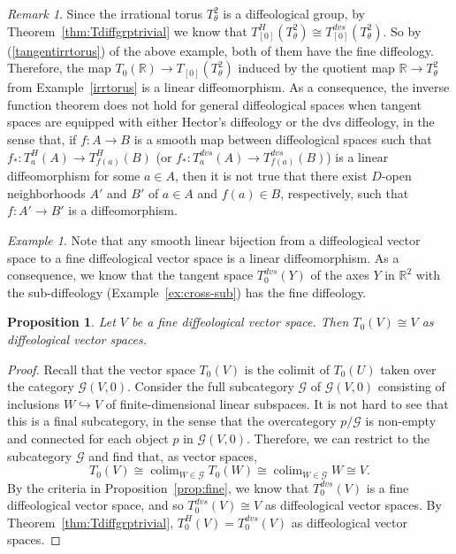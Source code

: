 \documentclass[12pt]{amsart}
\newtheorem{prop}[de]{Proposition}
\theoremstyle{remark}
\newtheorem{rem}[de]{Remark}
\newtheorem{ex}[de]{Example}
\DeclareMathOperator*{\colim}{colim}
\newcommand{\ra}{\to}
\newcommand{\cG}{{\mathcal{G}}}
\def \R{\mathbb{R}}
\begin{document}
\begin{rem}\label{rem:inverse}
Since the irrational torus $T^2_\theta$ is a diffeological group, by Theorem~\ref{thm:Tdiffgrptrivial}
we know that $T^H_{[0]}(T^2_\theta) \cong T^{dvs}_{[0]}(T^2_\theta)$.
So by (\ref{tangentirrtorus}) of the above example, both of them have the fine diffeology.
Therefore, the map $T_0(\R) \ra T_{[0]}(T^2_\theta)$ induced by the
quotient map $\R \to T^2_\theta$ from Example~\ref{irrtorus} is a linear diffeomorphism.
As a consequence, the inverse function theorem does not hold for general diffeological spaces
when tangent spaces are equipped with either Hector's diffeology or the dvs diffeology,
in the sense that, if $f:A \ra B$ is a smooth map between diffeological spaces such that
$f_*:T_a^H(A) \ra T_{f(a)}^H(B)$ (or $f_*:T_a^{dvs}(A) \ra T_{f(a)}^{dvs}(B)$) is a linear diffeomorphism for some $a \in A$,
then it is not true that there exist $D$-open neighborhoods $A'$ and $B'$ of $a \in A$ and $f(a) \in B$, respectively,
such that $f:A' \ra B'$ is a diffeomorphism.
\end{rem}

\begin{ex}
Note that any smooth linear bijection from a diffeological vector space
to a fine diffeological vector space is a linear diffeomorphism.
As a consequence, we know that the tangent space $T_0^{dvs}(Y)$ of the axes $Y$
in $\R^2$ with the sub-diffeology (Example~\ref{ex:cross-sub}) has the fine diffeology.
\end{ex}

\begin{prop}\label{prop:finedvs}
Let $V$ be a fine diffeological vector space.
Then $T_0(V) \cong V$ as diffeological vector spaces.
\end{prop}

\begin{proof}
Recall that the vector space $T_0(V)$ is the colimit of $T_0(U)$
taken over the category $\cG(V,0)$.
Consider the full subcategory $\cG$ of $\cG(V,0)$
consisting of inclusions $W \hookrightarrow V$ of finite-dimensional linear subspaces.
It is not hard to see that this is a final subcategory, in the sense that
the overcategory $p/\cG$ is non-empty and connected for each
object $p$ in $\cG(V,0)$.
Therefore, we can restrict to the subcategory $\cG$
and find that, as vector spaces,
\[
  T_0(V) \cong \colim_{W \in \cG} T_0(W) \cong \colim_{W \in \cG} W \cong V.
\]
By the criteria in Proposition~\ref{prop:fine}, we know that $T_0^{dvs}(V)$
is a fine diffeological vector space, and so $T_0^{dvs}(V) \cong V$ as
diffeological vector spaces.
By Theorem~\ref{thm:Tdiffgrptrivial},
$T_0^H(V) = T_0^{dvs}(V)$ as diffeological vector spaces.
\end{proof}
\end{document}
